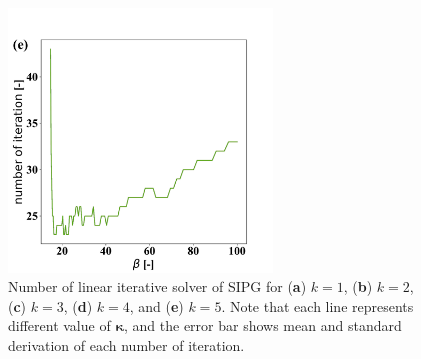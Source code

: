 \documentclass{article}
\begin{document}
\begin{figure}[h!]
        \includegraphics[width=7.0cm, height=7.0cm]{pictures/ell_homo_diff_k_sipg_it_k5.pdf}
   \caption{Number of linear iterative solver of SIPG for (\textbf{a}) $k=1$, (\textbf{b}) $k=2$, (\textbf{c}) $k=3$, (\textbf{d}) $k=4$, and (\textbf{e}) $k=5$. Note that each line represents different value of $\bm{\kappa}$, and the error bar shows mean and standard derivation of each number of iteration.}
   \label{fig:ell_homo_sipg_noi}
\end{figure}
\end{document}
